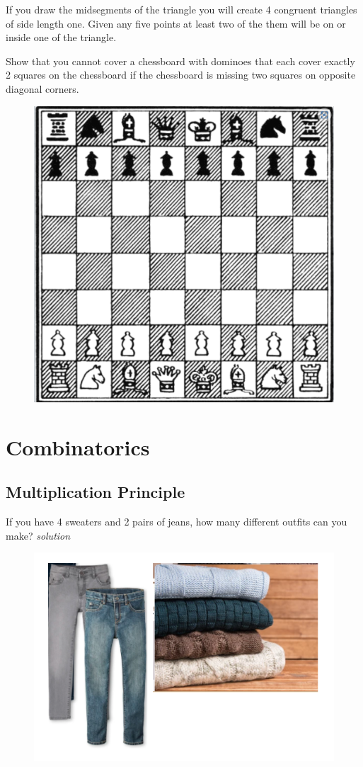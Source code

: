 \documentclass{amsbook}
\begin{document}
\begin{Answer}[ref={php1}]
    If you draw the midsegments of the triangle you will create 4 congruent triangles of side length one. Given any five points at least two of the them will be on or inside one of the triangle.
\end{Answer}

\begin{Exercise}[title={Another Chessboard Problem}, difficulty=2, label=php7]
    Show that you cannot cover a chessboard with dominoes that each cover exactly 2 squares on the chessboard if the chessboard is missing two squares on opposite diagonal corners.
    \begin{figure}[H]
        \includegraphics[width=.3\linewidth]{m.png}
    \end{figure}
\end{Exercise}

\begin{Answer}[ref={php7}]
    
\end{Answer}

\chapter{Combinatorics}

\section{Multiplication Principle}

\begin{Exercise}[title={Making Choices...},difficulty=0, label=m1]
    If you have 4 sweaters and 2 pairs of jeans, how many different outfits can you make? \hfill \emph{solution}  
    \begin{figure}[H]
        \includegraphics[width=.5\linewidth]{h.png}
    \end{figure}
    
\end{Exercise}
\end{document}
